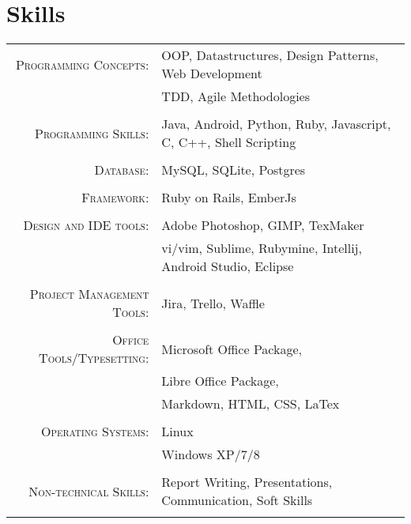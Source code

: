 \documentclass[a4paper,10pt]{article}
\begin{document}
\section{Skills}
\begin{tabular}{rl}	
\textsc{Programming Concepts:} &OOP, Datastructures, Design Patterns, Web Development \\
								& TDD, Agile Methodologies\\\\
\textsc{Programming Skills:}  & Java, Android, Python, Ruby, Javascript, C, C++, Shell Scripting\\\\
\textsc{Database:} & MySQL, SQLite, Postgres\\\\
\textsc{Framework:} &Ruby on Rails, EmberJs  \\\\
\textsc{Design and IDE tools:} & Adobe Photoshop, GIMP, TexMaker\\
							   & vi/vim, Sublime, Rubymine, Intellij, Android Studio, Eclipse\\\\
\textsc{Project Management Tools:} & Jira, Trello, Waffle\\\\	
\textsc{Office Tools/Typesetting:} & Microsoft Office Package,\\
								   & Libre Office Package,\\
								   & Markdown, HTML, CSS, LaTex\\\\
								   
\textsc{Operating Systems:} &Linux\\
							&Windows XP/7/8\\\\
							
\textsc{Non-technical Skills:} &Report Writing, Presentations, Communication, Soft Skills\\\\			 
\end{tabular}
\end{document}
